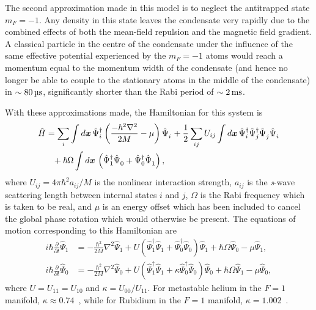 The second approximation made in this model is to neglect the antitrapped state $m_F=-1$. Any density in this state leaves the condensate very rapidly due to the combined effects of both the mean-field repulsion and the magnetic field gradient. A classical particle in the centre of the condensate under the influence of the same effective potential experienced by the $m_F=-1$ atoms would reach a momentum equal to the momentum width of the condensate (and hence no longer be able to couple to the stationary atoms in the middle of the condensate) in $\sim\unit[80]{\micro s}$, significantly shorter than the Rabi period of $\sim \unit[2]{ms}$.

With these approximations made, the Hamiltonian for this system is
\begin{align}
    \label{Peaks:InitialHamiltonian}
    \begin{split}
    \hat{H} &= \sum_i \int d\vect{x}\, \hat{\Psi}_i^\dagger \left(\frac{-\hbar^2 \nabla^2}{2 M} - \mu\right)\hat{\Psi}_i^{\phantom{\dagger}} + \frac{1}{2} \sum_{i j} U_{i j}\int d\vect{x}\, \hat{\Psi}_i^\dagger \hat{\Psi}_j^\dagger \hat{\Psi}_j^{\phantom{\dagger}} \hat{\Psi}_i^{\phantom{\dagger}}\\
            &\phantom{=} + \hbar \Omega \int d\vect{x}\, \left(\hat{\Psi}_1^\dagger \hat{\Psi}_0^{\phantom{\dagger}} + \hat{\Psi}_0^\dagger \hat{\Psi}_1^{\phantom{\dagger}}\right),
    \end{split}
\end{align}
where $U_{ij} = 4\pi \hbar^2 a_{ij}/M$ is the nonlinear interaction strength, $a_{ij}$ is the \emph{s}-wave scattering length between internal states $i$ and $j$, $\Omega$ is the Rabi frequency which is taken to be real, and $\mu$ is an energy offset which has been included to cancel the global phase rotation which would otherwise be present. The equations of motion corresponding to this Hamiltonian are
\begin{subequations}
    \label{Peaks:OperatorEquationsOfMotion}
    \begin{align}
    i \hbar \frac{\partial }{\partial t}\hat{\Psi}_1  &= -\frac{\hbar^2}{2M}\nabla^2 \hat{\Psi}_1  + U \left(\hat{\Psi}_1^\dagger \hat{\Psi}_1^{\phantom{\dagger}} + \hat{\Psi}_0^\dagger \hat{\Psi}_0^{\phantom{\dagger}}\right) \hat{\Psi}_1 + \hbar \Omega \hat{\Psi}_0 - \mu \hat{\Psi}_1,  \\
    i \hbar \frac{\partial }{\partial t}\hat{\Psi}_0 &= -\frac{\hbar^2}{2M} \nabla^2 \hat{\Psi}_0 + U \left(\hat{\Psi}_1^\dagger \hat{\Psi}_1^{\phantom{\dagger}} + \kappa \hat{\Psi}_0^\dagger \hat{\Psi}_0^{\phantom{\dagger}} \right) \hat{\Psi}_0 + \hbar \Omega \hat{\Psi}_1 - \mu \hat{\Psi}_0,
    \end{align}
\end{subequations}
where $U=U_{11}=U_{10}$ and $\kappa = U_{00}/U_{11}$.  For metastable helium in the $F=1$ manifold, $\kappa \approx 0.74$~\citep{Leo:2001}, while for Rubidium in the $F=1$ manifold, $\kappa = 1.002$~\cite{Kempen:2002,Widera:2006}.

